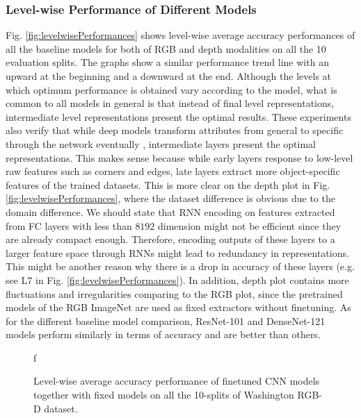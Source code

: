 \subsubsection{Level-wise Performance of Different Models} \label{sec.exp.ma.levelPerformances}
Fig. \ref{fig:levelwisePerformances} shows level-wise average accuracy performances of all the baseline models for both of RGB and depth modalities on all the 10 evaluation splits. The graphs show a similar performance trend line with an upward at the beginning and a downward at the end. Although the levels at which optimum performance is obtained vary according to the model, what is common to all models in general is that instead of final level representations, intermediate level representations present the optimal results. These experiments also verify that while deep models transform attributes from general to specific through  the network eventually \citep{Razavian_CVPRW_2014, Zeiler_ECCV_2014}, intermediate layers present the optimal representations. This makes sense because while early layers response to low-level raw features such as corners and edges, late layers extract more object-specific features of the trained datasets. This is more clear on the depth plot in Fig. \ref{fig:levelwisePerformances}, where the dataset difference is obvious due to the domain difference. We should state that RNN encoding on features extracted from FC layers with less than $8192$ dimension might not be efficient since they are already compact enough. Therefore, encoding outputs of these layers to a larger feature space through RNNs might lead to redundancy in representations. This might be another reason why there is a drop in accuracy of these layers (e.g. see L7 in Fig. \ref{fig:levelwisePerformances}). In addition, depth plot contains more fluctuations and irregularities comparing to the RGB plot, since the pretrained models of the RGB ImageNet are used as fixed extractors without finetuning. As for the different baseline model comparison, ResNet-101 and DenseNet-121 models perform similarly in terms of accuracy and are better than others.
\begin{figure*}[!hb]
	\centering
	 f	\caption{Level-wise average accuracy performance of finetuned CNN models together with fixed models on all the 10-splits of Washington RGB-D dataset.}
	\label{fig:finetuning}
\end{figure*}
